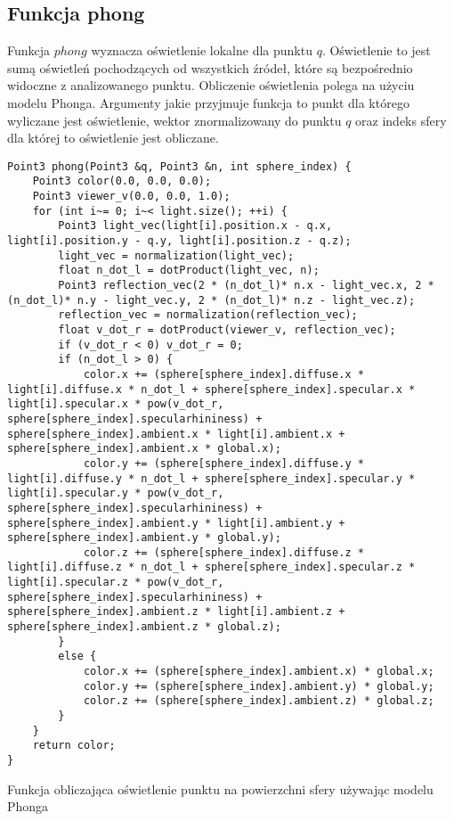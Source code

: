 \documentclass[11pt,a4paper,titlepage]{article}
\newenvironment{longlisting}{\captionsetup{type=listing}}{}
\begin{document}
\subsection{Funkcja phong}
Funkcja $phong$ wyznacza oświetlenie lokalne dla punktu $q$. Oświetlenie to jest sumą oświetleń pochodzących od wszystkich źródeł, które są bezpośrednio widoczne z analizowanego punktu. Obliczenie oświetlenia polega na użyciu modelu Phonga. Argumenty jakie przyjmuje funkcja to punkt dla którego wyliczane jest oświetlenie, wektor znormalizowany do punktu $q$ oraz indeks sfery dla której to oświetlenie jest obliczane.
\begin{longlisting}
\begin{verbatim}
Point3 phong(Point3 &q, Point3 &n, int sphere_index) {
	Point3 color(0.0, 0.0, 0.0);
	Point3 viewer_v(0.0, 0.0, 1.0);
	for (int i~= 0; i~< light.size(); ++i) {
		Point3 light_vec(light[i].position.x - q.x, light[i].position.y - q.y, light[i].position.z - q.z);
		light_vec = normalization(light_vec);
		float n_dot_l = dotProduct(light_vec, n);
		Point3 reflection_vec(2 * (n_dot_l)* n.x - light_vec.x, 2 * (n_dot_l)* n.y - light_vec.y, 2 * (n_dot_l)* n.z - light_vec.z);
		reflection_vec = normalization(reflection_vec);
		float v_dot_r = dotProduct(viewer_v, reflection_vec);
		if (v_dot_r < 0) v_dot_r = 0;
		if (n_dot_l > 0) {
			color.x += (sphere[sphere_index].diffuse.x * light[i].diffuse.x * n_dot_l + sphere[sphere_index].specular.x * light[i].specular.x * pow(v_dot_r, sphere[sphere_index].specularhininess) + sphere[sphere_index].ambient.x * light[i].ambient.x + sphere[sphere_index].ambient.x * global.x);
			color.y += (sphere[sphere_index].diffuse.y * light[i].diffuse.y * n_dot_l + sphere[sphere_index].specular.y * light[i].specular.y * pow(v_dot_r, sphere[sphere_index].specularhininess) + sphere[sphere_index].ambient.y * light[i].ambient.y + sphere[sphere_index].ambient.y * global.y);
			color.z += (sphere[sphere_index].diffuse.z * light[i].diffuse.z * n_dot_l + sphere[sphere_index].specular.z * light[i].specular.z * pow(v_dot_r, sphere[sphere_index].specularhininess) + sphere[sphere_index].ambient.z * light[i].ambient.z + sphere[sphere_index].ambient.z * global.z);
		}
		else {
			color.x += (sphere[sphere_index].ambient.x) * global.x;
			color.y += (sphere[sphere_index].ambient.y) * global.y;
			color.z += (sphere[sphere_index].ambient.z) * global.z;
		}
	}
	return color;
}
\end{verbatim}
\caption{Funkcja obliczająca oświetlenie punktu na powierzchni sfery używając modelu Phonga}
\end{longlisting}
\end{document}

